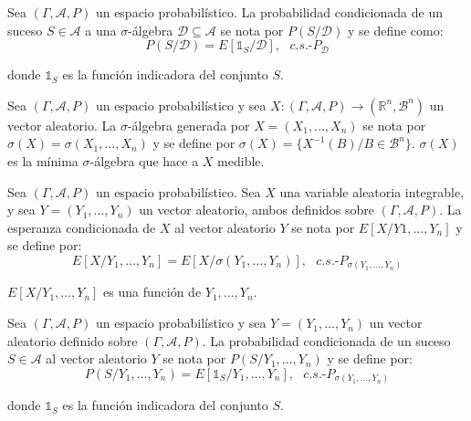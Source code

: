 \begin{definicion}
Sea $(\Gamma, \mathcal{A}, P)$ un espacio probabilístico. La probabilidad condicionada de un suceso $S\in \mathcal{A}$ a una $\sigma$-álgebra $\mathcal{D}\subseteq \mathcal{A}$ se nota por $P(S/\mathcal{D})$ y se define como:
$$P(S/\mathcal{D}) = E[\mathds{1}_S/\mathcal{D}], \text{ } c.s.\text{-}P_{\mathcal{D}}$$

donde $\mathds{1}_S$ es la función indicadora del conjunto $S$.
\end{definicion}

\begin{definicion}
Sea $(\Gamma, \mathcal{A}, P)$ un espacio probabilístico y sea $X:(\Gamma, \mathcal{A}, P) \rightarrow (\mathds{R}^n, \mathscr{B}^n)$ un vector aleatorio. La $\sigma$-álgebra generada por $X=(X_1,\ldots ,X_n)$ se nota por $\sigma(X) = \sigma(X_1,\ldots ,X_n)$ y se define por $\sigma(X) = \{X^{-1}(B)/ B\in \mathscr{B}^n\}$. $\sigma(X)$ es la mínima $\sigma$-álgebra que hace a $X$ medible.
\end{definicion}

\begin{definicion}
Sea $(\Gamma, \mathcal{A}, P)$ un espacio probabilístico. Sea $X$ una variable aleatoria integrable, y sea $Y=(Y_1,\ldots ,Y_n)$ un vector aleatorio, ambos definidos sobre $(\Gamma, \mathcal{A}, P)$. La esperanza condicionada de $X$ al vector aleatorio $Y$ se nota por $E[X/Y1,\ldots ,Y_n]$ y se define por:
$$E[X/Y_1,\ldots ,Y_n]=E[X/\sigma(Y_1,\ldots ,Y_n)], \text{ }c.s.\text{-}P_{\sigma(Y_1,\ldots ,Y_n)}$$
\end{definicion}

\begin{proposicion}
$E[X/Y_1,\ldots ,Y_n]$ es una función de $Y_1,\ldots ,Y_n$.
\end{proposicion}

\begin{definicion}
Sea $(\Gamma, \mathcal{A}, P)$ un espacio probabilístico y sea $Y=(Y_1,\ldots ,Y_n)$ un vector aleatorio definido sobre $(\Gamma, \mathcal{A}, P)$. La probabilidad condicionada de un suceso $S\in \mathcal{A}$ al vector aleatorio $Y$ se nota por $P(S/Y_1,\ldots ,Y_n)$ y se define por:
$$P(S/Y_1,\ldots ,Y_n) = E[\mathds{1}_S/Y_1,\ldots ,Y_n], \text{ } c.s.\text{-}P_{\sigma(Y_1,\ldots ,Y_n)}$$

donde $\mathds{1}_S$ es la función indicadora del conjunto $S$.
\end{definicion}

